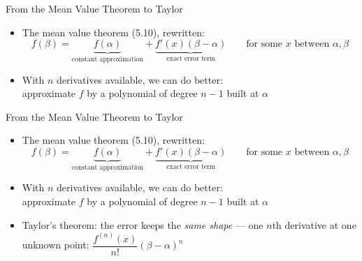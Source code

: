 \documentclass[aspectratio=169,12pt,t]{beamer}
\begin{document}
{%
\begin{frame}{From the Mean Value Theorem to Taylor}
  \begin{hlbox}
  \begin{itemize}
    \item The mean value theorem (5.10), rewritten:
      \[
        f(\beta) = \underbrace{f(\alpha)}_{\text{constant approximation}}
        + \underbrace{f'(x)(\beta - \alpha)}_{\text{exact error term}}
        \qquad \text{for some } x \text{ between } \alpha, \beta
      \]
    \item With $n$ derivatives available, we can do better:\\
      approximate $f$ by a \alert{polynomial of degree $n-1$} built at $\alpha$
  \end{itemize}
  \end{hlbox}

\end{frame}

\begin{frame}{From the Mean Value Theorem to Taylor}
  \begin{hlbox}
  \begin{itemize}
    \item The mean value theorem (5.10), rewritten:
      \[
        f(\beta) = \underbrace{f(\alpha)}_{\text{constant approximation}}
        + \underbrace{f'(x)(\beta - \alpha)}_{\text{exact error term}}
        \qquad \text{for some } x \text{ between } \alpha, \beta
      \]
    \item With $n$ derivatives available, we can do better:\\
      approximate $f$ by a \alert{polynomial of degree $n-1$} built at $\alpha$
    \item \alert{Taylor's theorem:} the error keeps the \emph{same shape} ---
      one $n$th derivative at one unknown point:
      $\dfrac{f^{(n)}(x)}{n!}(\beta-\alpha)^n$
  \end{itemize}
  \end{hlbox}


\end{frame}}
\end{document}
